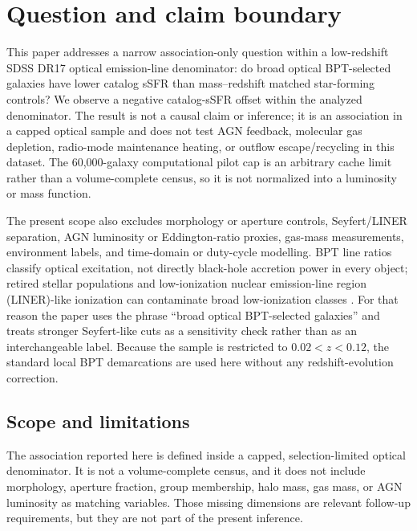 \documentclass[twocolumn]{aastex631}
\begin{document}
\section{Question and claim boundary}
This paper addresses a narrow association-only question within a low-redshift SDSS DR17 optical emission-line denominator: do broad optical BPT-selected galaxies have lower catalog sSFR than mass--redshift matched star-forming controls? We observe a negative catalog-sSFR offset within the analyzed denominator. The result is not a causal claim or inference; it is an association in a capped optical sample and does not test AGN feedback, molecular gas depletion, radio-mode maintenance heating, or outflow escape/recycling in this dataset.
The 60,000-galaxy computational pilot cap is an arbitrary cache limit rather than a volume-complete census, so it is not normalized into a luminosity or mass function.


The present scope also excludes morphology or aperture controls, Seyfert/LINER separation, AGN luminosity or Eddington-ratio proxies, gas-mass measurements, environment labels, and time-domain or duty-cycle modelling. BPT line ratios classify optical excitation, not directly black-hole accretion power in every object; retired stellar populations and low-ionization nuclear emission-line region (LINER)-like ionization can contaminate broad low-ionization classes \citep{stasinska2008,stasinska2015}. For that reason the paper uses the phrase ``broad optical BPT-selected galaxies'' and treats stronger Seyfert-like cuts as a sensitivity check rather than as an interchangeable label. Because the sample is restricted to $0.02<z<0.12$, the standard local BPT demarcations are used here without any redshift-evolution correction.

\subsection{Scope and limitations}
The association reported here is defined inside a capped, selection-limited optical denominator. It is not a volume-complete census, and it does not include morphology, aperture fraction, group membership, halo mass, gas mass, or AGN luminosity as matching variables. Those missing dimensions are relevant follow-up requirements, but they are not part of the present inference.
\end{document}
